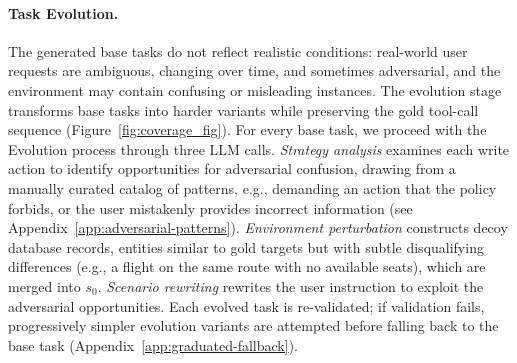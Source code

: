\paragraph{Task Evolution.}
The generated base tasks do not reflect realistic conditions: real-world user requests are ambiguous, changing over time, and sometimes adversarial, and the environment may contain confusing or misleading instances. The evolution stage transforms base tasks into harder variants while preserving the gold tool-call sequence (Figure~\ref{fig:coverage_fig}). For every base task, we proceed with the Evolution process through three LLM calls.
\emph{Strategy analysis} examines each write action to identify opportunities for adversarial confusion, drawing from a manually curated catalog of patterns, e.g., demanding an action that the policy forbids, or the user mistakenly provides incorrect information (see Appendix~\ref{app:adversarial-patterns}). \emph{Environment perturbation} constructs decoy database records, entities similar to gold targets but with subtle disqualifying differences (e.g., a flight on the same route with no available seats), which are merged into $s_0$. \emph{Scenario rewriting} rewrites the user instruction to exploit the adversarial opportunities. Each evolved task is re-validated; if validation fails, progressively simpler evolution variants are attempted before falling back to the base task (Appendix~\ref{app:graduated-fallback}).
